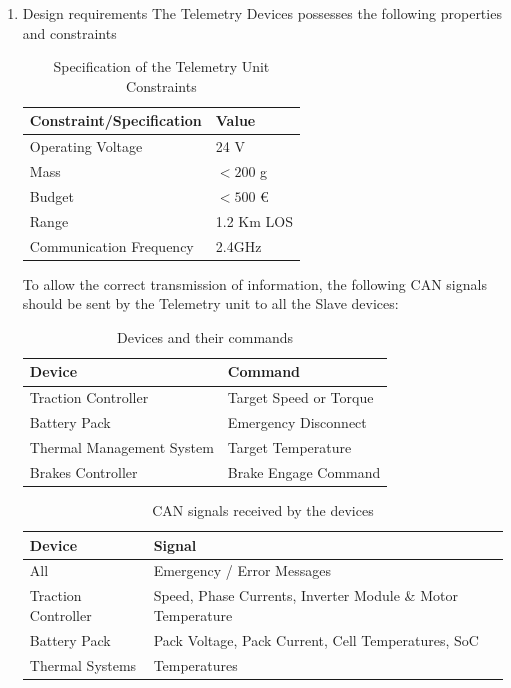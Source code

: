 \begin{enumerate}
    \item Design requirements
The Telemetry Devices possesses the following properties and constraints

\begin{table}[htbp]
    \centering
    \begin{tabular}{|l|l|}
        \toprule
        \textbf{Constraint/Specification} & \textbf{Value} \\
        \midrule
        Operating Voltage & 24 V \\
        Mass & $<200$ g \\
        Budget & $<500$ € \\
        Range & 1.2 Km LOS \\
        Communication Frequency & 2.4GHz \\
        \bottomrule
    \end{tabular}
     \caption{Specification of the Telemetry Unit Constraints}
\label{tab:Telemetry Constraints}
\end{table}

To allow the correct transmission of information, the following CAN signals should be sent by the Telemetry unit to all the Slave devices:
\begin{table}[htbp]
    \centering
    \begin{tabular}{|l|l|}
        \textbf{Device} & \textbf{Command} \\
        \midrule
        Traction Controller & Target Speed or Torque \\
        Battery Pack & Emergency Disconnect \\
        Thermal Management System & Target Temperature \\
        Brakes Controller & Brake Engage Command \\
        \bottomrule
    \end{tabular}
 \caption{Devices and their commands}
\label{tab:Command devices.}
\end{table}

\begin{table}[htbp]
    \centering
    \begin{tabular}{|l|l|}
        \toprule
        \textbf{Device} & \textbf{Signal} \\
        \midrule
        All & Emergency / Error Messages \\
        Traction Controller & Speed, Phase Currents, Inverter Module \& Motor Temperature \\
        Battery Pack & Pack Voltage, Pack Current, Cell Temperatures, SoC \\
        Thermal Systems & Temperatures \\
        \bottomrule
    \end{tabular}
    \caption{CAN signals received by the devices}
\label{tab:CAN signals.}
\end{table}


\end{enumerate}
